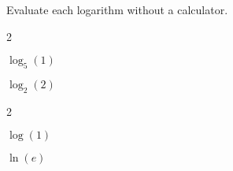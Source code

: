 \begin{myPrep}
Evaluate each logarithm without a calculator.
	\begin{enumerate}
		\vfill

		\vfill
	\end{enumerate}
\end{myPrep}

